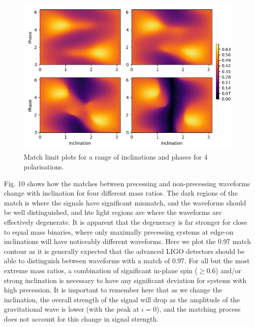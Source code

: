 \documentclass[11pt]{article}
\begin{document}
\begin{figure}
	\includegraphics[width=1\textwidth]{fig12.png}
	\centering
	\caption{Match limit plots for a range of inclinations and phases for 4 polarisations.}
	\centering
\end{figure}

Fig. 10 shows how the matches between precessing and non-precessing waveforms change with inclination for four different mass ratios. The dark regions of the match is where the signals have significant mismatch, and the waveforms should be well distinguished, and hte light regions are where the waveforms are effectively degenerate. It is apparent that the degeneracy is far stronger for close to equal mass binaries, where only maximally precessing systems at edge-on inclinations will have noticeably different waveforms. Here we plot the 0.97 match contour as it is generally expected that the advanced LIGO detectors should be able to distinguish between waveforms with a match of 0.97. For all but the most extreme mass ratios, a combination of significant in-plane spin ($\geq0.6$) and/or strong inclination is necessary to have any significant deviation for systems with high precession. It is important to remember here that as we change the inclination, the overall strength of the signal will drop as the amplitude of the gravitational wave is lower (with the peak at $\iota=0$), and the matching process does not account for this change in signal strength.
\end{document}
